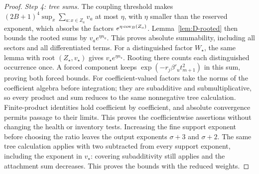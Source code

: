 \begin{proof}
\emph{Step 4: tree sums.} The coupling threshold makes $(2B+1)^4\sup_x\sum_{a:x\in Z_a}v_a$ at most $\eta$, with $\eta$ smaller than the reserved exponent, which absorbs the factors $e^{\eta\operatorname{cov}_B(Z_a)}$. Lemma~\ref{lem:D-rooted} then bounds the rooted sums by $v_ae^{\eta n_a}$. This proves absolute summability, including all sectors and all differentiated terms. For a distinguished factor $W_\star$, the same lemma with root $(Z_\star,v_\star)$ gives $v_\star e^{\eta n_\star}$. Rooting there counts each distinguished occurrence once. A forced component keeps $\exp(-r_j\beta'_u t_{m+1}^2)$ in this sum, proving both forced bounds. For coefficient-valued factors take the norms of the coefficient algebra before integration; they are subadditive and submultiplicative, so every product and sum reduces to the same nonnegative tree calculation. Finite-product identities hold coefficient by coefficient, and absolute convergence permits passage to their limits. This proves the coefficientwise assertions without changing the health or inventory tests. Increasing the fine support exponent before choosing the ratio leaves the output exponents $\sigma+3$ and $\sigma+2$. The same tree calculation applies with two subtracted from every support exponent, including the exponent in $v_\star$: covering subadditivity still applies and the attachment sum decreases. This proves the bounds with the reduced weights.


\end{proof}
